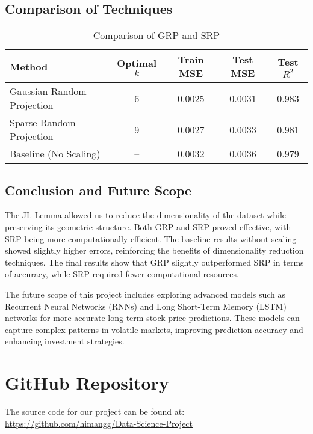 \documentclass[conference]{IEEEtran}
\newcommand{\githublink}{\url{https://github.com/himangg/Data-Science-Project}}
\begin{document}
\subsection{Comparison of Techniques}
\vspace{-0.3cm}
\begin{table}[H]
\centering
\caption{Comparison of GRP and SRP}
\label{tab:comparison}
\begin{tabular}{|l|c|c|c|c|}
\hline
\textbf{Method}                & \textbf{Optimal \(k\)} & \textbf{Train MSE} & \textbf{Test MSE} & \textbf{Test \(R^2\)} \\ \hline
Gaussian Random Projection     & 6                     & 0.0025            & 0.0031           & 0.983               \\ \hline
Sparse Random Projection       & 9                     & 0.0027            & 0.0033           & 0.981               \\ \hline
Baseline (No Scaling)          & --                    & 0.0032            & 0.0036           & 0.979               \\ \hline
\end{tabular}
\end{table}

\subsection{Conclusion and Future Scope}
The JL Lemma allowed us to reduce the dimensionality of the dataset while preserving its geometric structure. Both GRP and SRP proved effective, with SRP being more computationally efficient. The baseline results without scaling showed slightly higher errors, reinforcing the benefits of dimensionality reduction techniques. The final results show that GRP slightly outperformed SRP in terms of accuracy, while SRP required fewer computational resources.

The future scope of this project includes exploring advanced models such as Recurrent Neural Networks (RNNs) and Long Short-Term Memory (LSTM) networks for more accurate long-term stock price predictions. These models can capture complex patterns in volatile markets, improving prediction accuracy and enhancing investment strategies.

\section{GitHub Repository}
    The source code for our project can be found at: \githublink
\end{document}
